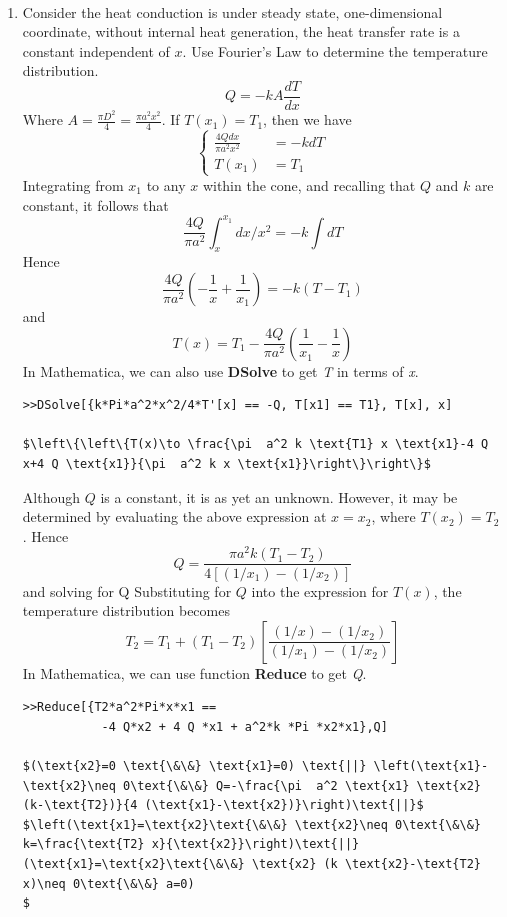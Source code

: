 \begin{solution}
~\\
\begin{enumerate}
\item
Consider the heat conduction is under steady state, one-dimensional coordinate,
without internal heat generation, the heat transfer rate is a constant independent
of $x$. Use Fourier’s Law to determine the temperature distribution.
$$Q=-kA\frac{dT}{dx}$$
Where $A=\frac{\pi D^2}{4}=\frac{\pi a^2x^2}{4}$. If $T(x_1)=T_1$, then we have
\begin{equation*}
\left\{
\begin{aligned}
 \frac{4Qdx}{\pi a^2x^2}&=-kdT \\
 T(x_1)&=T_1
\end{aligned}
\right.
\end{equation*}
Integrating from $x_1$ to any $x$ within the cone, and recalling that $Q$ and $k$
are constant, it follows that
$$\frac{4Q}{\pi a^2}\int_x^{x_1} dx/x^2=-k\int dT$$
Hence
$$\frac{4Q}{\pi a^2}\left(-\frac{1}{x}+\frac{1}{x_1}\right)=-k\left(T-T_1\right)$$
and
$$T(x)=T_1-\frac{4Q}{\pi a^2}\left(\frac{1}{x_1}-\frac{1}{x}\right)$$
In Mathematica, we can also use \textbf{DSolve} to get \emph{T} in terms of \emph{x}.
\begin{lstlisting}
>>DSolve[{k*Pi*a^2*x^2/4*T'[x] == -Q, T[x1] == T1}, T[x], x]

$\left\{\left\{T(x)\to \frac{\pi  a^2 k \text{T1} x \text{x1}-4 Q x+4 Q \text{x1}}{\pi  a^2 k x \text{x1}}\right\}\right\}$
\end{lstlisting}
Although $Q$ is a constant, it is as yet an unknown.
However, it may be determined by evaluating the above expression at
$x=x_2$, where $T(x_2)=T_2$. Hence
$$Q=\frac{\pi a^2k(T_1-T_2)}{4[(1/x_1)-(1/x_2)]}$$
and solving for Q
Substituting for $Q$ into the expression for $T(x)$,
the temperature distribution becomes
$$T_2=T_1+(T_1-T_2)\left[\frac{(1/x)-(1/x_2)}{(1/x_1)-(1/x_2)}
\right]$$
In Mathematica, we can use function \textbf{Reduce} to get \emph{Q}.
\begin{lstlisting}
>>Reduce[{T2*a^2*Pi*x*x1 ==
           -4 Q*x2 + 4 Q *x1 + a^2*k *Pi *x2*x1},Q]
        
$(\text{x2}=0 \text{\&\&} \text{x1}=0) \text{||} \left(\text{x1}-\text{x2}\neq 0\text{\&\&} Q=-\frac{\pi  a^2 \text{x1} \text{x2} (k-\text{T2})}{4 (\text{x1}-\text{x2})}\right)\text{||}$
$\left(\text{x1}=\text{x2}\text{\&\&} \text{x2}\neq 0\text{\&\&} k=\frac{\text{T2} x}{\text{x2}}\right)\text{||} (\text{x1}=\text{x2}\text{\&\&} \text{x2} (k \text{x2}-\text{T2} x)\neq 0\text{\&\&} a=0)
$
\end{lstlisting}


\end{enumerate}
\end{solution}
